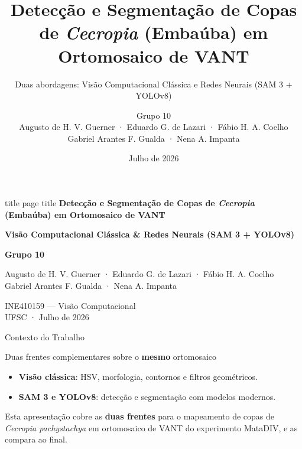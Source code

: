 \documentclass[aspectratio=169, 11pt]{beamer}
\title[Detecção de Embaúba]{Detecção e Segmentação de Copas de \textit{Cecropia} (Embaúba) em Ortomosaico de VANT}
\subtitle{Duas abordagens: Visão Computacional Clássica e Redes Neurais (SAM 3 + YOLOv8)}
\author[Grupo 10]{\texorpdfstring{Grupo 10\\
\small Augusto de H. V. Guerner · Eduardo G. de Lazari · Fábio H. A. Coelho\\
\small Gabriel Arantes F. Gualda · Nena A. Impanta}{Grupo 10}}
\institute{INE410159 — Visão Computacional \\ UFSC}
\date{Julho de 2026}
\begin{document}
\begin{frame}[plain]
    \vspace{0.35cm}
    \begin{beamercolorbox}[wd=\textwidth,center,sep=0.3cm]{title page title}
        {\LARGE\bfseries Detecção e Segmentação de Copas de \textit{Cecropia} (Embaúba) em Ortomosaico de VANT}
    \end{beamercolorbox}

    \vspace{0.45cm}
    \begin{center}
        {\large\color{Canopy}\bfseries Visão Computacional Clássica \& Redes Neurais (SAM 3 + YOLOv8)}

        \vspace{0.55cm}
        {\Large\color{Bark}\bfseries Grupo 10}

        \vspace{0.25cm}
        {\small Augusto de H. V. Guerner · Eduardo G. de Lazari · Fábio H. A. Coelho}\\
        {\small Gabriel Arantes F. Gualda · Nena A. Impanta}

        \vspace{0.55cm}
        {\small INE410159 — Visão Computacional}\\
        {\small UFSC · Julho de 2026}
    \end{center}
\end{frame}

\begin{frame}{Contexto do Trabalho}
    \begin{block}{Duas frentes complementares sobre o \textbf{mesmo} ortomosaico}
        \begin{itemize}
            \item \textbf{Visão clássica}: HSV, morfologia, contornos e filtros geométricos.
            \item \textbf{SAM 3 e YOLOv8}: detecção e segmentação com modelos modernos.
        \end{itemize}
    \end{block}

    \vspace{0.4em}
    Esta apresentação cobre as \textbf{duas frentes} para o mapeamento de copas de
    \textit{Cecropia pachystachya} em ortomosaico de VANT do experimento MataDIV,
    e as compara ao final.
\end{frame}
\end{document}
